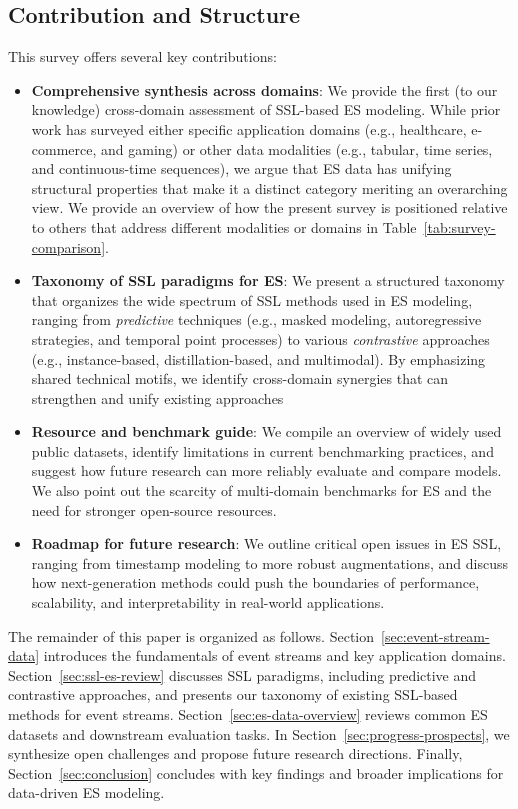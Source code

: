 \documentclass[twoside,11pt]{article}
\begin{document}
\subsection{Contribution and Structure}
This survey offers several key contributions:
\begin{itemize}
    \item {\bf Comprehensive synthesis across domains}: We provide the first (to our knowledge) cross-domain assessment of SSL-based ES modeling. While prior work has surveyed either specific application domains (e.g., healthcare, e-commerce, and gaming) or other data modalities (e.g., tabular, time series, and continuous-time sequences), we argue that ES data has unifying structural properties that make it a distinct category meriting an overarching view. We provide an overview of how the present survey is positioned relative to others that address different modalities or domains in Table~\ref{tab:survey-comparison}. %
    
    \item {\bf Taxonomy of SSL paradigms for ES}: We present a structured taxonomy that organizes the wide spectrum of SSL methods used in ES modeling, ranging from {\it predictive} techniques (e.g., masked modeling, autoregressive strategies, and temporal point processes) to various {\it contrastive} approaches (e.g., instance-based, distillation-based, and multimodal). By emphasizing shared technical motifs, we identify cross-domain synergies that can strengthen and unify existing approaches
    \item {\bf Resource and benchmark guide}: We compile an overview of widely used public datasets, identify limitations in current benchmarking practices, and suggest how future research can more reliably evaluate and compare models. We also point out the scarcity of multi-domain benchmarks for ES and the need for stronger open-source resources.
    \item {\bf Roadmap for future research}: We outline critical open issues in ES SSL, ranging from timestamp modeling to more robust augmentations, and discuss how next-generation methods could push the boundaries of performance, scalability, and interpretability in real-world applications.
\end{itemize}

The remainder of this paper is organized as follows. Section~\ref{sec:event-stream-data} introduces the fundamentals of event streams and key application domains. Section~\ref{sec:ssl-es-review} discusses SSL paradigms, including predictive and contrastive approaches, and presents our taxonomy of existing SSL-based methods for event streams. Section~\ref{sec:es-data-overview} reviews common ES datasets and downstream evaluation tasks. In Section~\ref{sec:progress-prospects}, we synthesize open challenges and propose future research directions. Finally, Section~\ref{sec:conclusion} concludes with key findings and broader implications for data-driven ES modeling.
\end{document}
